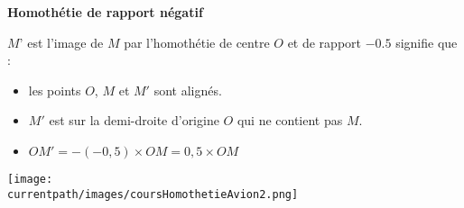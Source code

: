 \begin{exemple*1}
    {\color{red}\bfseries Homothétie de rapport négatif}

    $M’$ est l’image de $M$ par l’homothétie de centre $O$ et de rapport $-0.5$ signifie que :
    \begin{itemize}
        \item les points $O$, $M$ et $M'$ sont alignés.
        \item $M'$ est sur la demi-droite d'origine $O$ qui ne contient pas $M$.
        \item $OM'=-(-0,5)\times OM = 0,5\times OM$
    \end{itemize}
    \begin{center}
        \texttt{[image: \\currentpath/images/coursHomothetieAvion2.png]} 
    \end{center}
\end{exemple*1}

